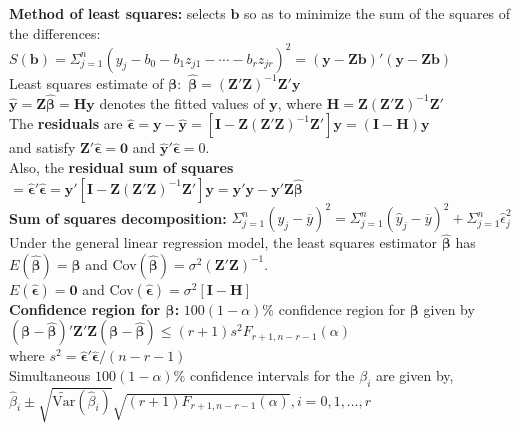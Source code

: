 \documentclass[5pt,twocolumn]{article}
\begin{document}
	\textbf{Method of least squares:} selects $\mathbf{b}$ so as to minimize the sum of the squares of the differences: $S(\mathbf{b}) = \Sigma_{j=1}^n (y_j - b_0 - b_1z_{j1} - \cdots - b_r z_{jr})^2 = (\mathbf{y} - \mathbf{Zb})'(\mathbf{y} - \mathbf{Zb})$\\
	\indent Least squares estimate of $\mathbf{\beta}:$ $\mathbf{\hat{\beta}} = (\mathbf{Z}'\mathbf{Z})^{-1}\mathbf{Z}'\mathbf{y}$\\
	$\mathbf{\hat{y}} = \mathbf{Z\hat{\beta}} = \mathbf{Hy}$ denotes the fitted values of $\mathbf{y}$, where $\mathbf{H} = \mathbf{Z}(\mathbf{Z'Z})^{-1}\mathbf{Z'}$\\
	The \textbf{residuals} are $\mathbf{\hat{\epsilon}} = \mathbf{y} - \mathbf{\hat{y}} = [\mathbf{I} - \mathbf{Z}(\mathbf{Z'Z})^{-1}\mathbf{Z'}]\mathbf{y} = (\mathbf{I} - \mathbf{H})\mathbf{y}$\\
	\indent and satisfy $\mathbf{Z'\hat{\epsilon}} = \mathbf{0}$ and $\mathbf{\hat{y}'\hat{\epsilon}} = 0$.\\
	Also, the \textbf{residual sum of squares} $= \mathbf{\hat{\epsilon}'\hat{\epsilon}} = \mathbf{y}'[\mathbf{I} - \mathbf{Z}(\mathbf{Z'Z})^{-1}\mathbf{Z'}]\mathbf{y} = \mathbf{y}'\mathbf{y} - \mathbf{y'Z\hat{\beta}}$\\
	\textbf{Sum of squares decomposition:} $\Sigma_{j=1}^n (y_j - \overline{y})^2 = \Sigma_{j=1}^n (\hat{y}_j - \overline{y})^2 + \Sigma_{j=1}^n \hat{\epsilon}_j^2$\\
	Under the general linear regression model, the least squares estimator $\mathbf{\hat{\beta}}$ has $E(\mathbf{\hat{\beta}}) = \mathbf{\beta}$ and Cov$(\mathbf{\hat{\beta}}) = \sigma^2(\mathbf{Z}'\mathbf{Z})^{-1}$.\\
	\indent $E(\mathbf{\hat{\epsilon}}) = \mathbf{0}$ and Cov$(\mathbf{\hat{\epsilon}}) = \sigma^2[\mathbf{I} - \mathbf{H}]$\\
	\textbf{Confidence region for $\mathbf{\beta}$:} $100(1-\alpha)$\% confidence region for $\mathbf{\beta}$ given by\\
	\indent $(\mathbf{\beta} - \mathbf{\hat{\beta}})'\mathbf{Z'Z}(\mathbf{\beta} - \mathbf{\hat{\beta}}) \leq (r+1)s^2F_{r+1, n-r-1}(\alpha)$\\
	\indent where $s^2 = \mathbf{\hat{\epsilon}'\hat{\epsilon}}/(n-r-1)$\\
	\indent Simultaneous $100(1 - \alpha)$\% confidence intervals for the $\beta_i$ are given by,\\
	\indent $\hat{\beta}_i \pm \sqrt{\widetilde{\text{Var}}(\hat{\beta}_i)}\sqrt{(r+1)F_{r+1, n-r-1}(\alpha)}, i = 0, 1, \ldots, r$\\
\end{document}
